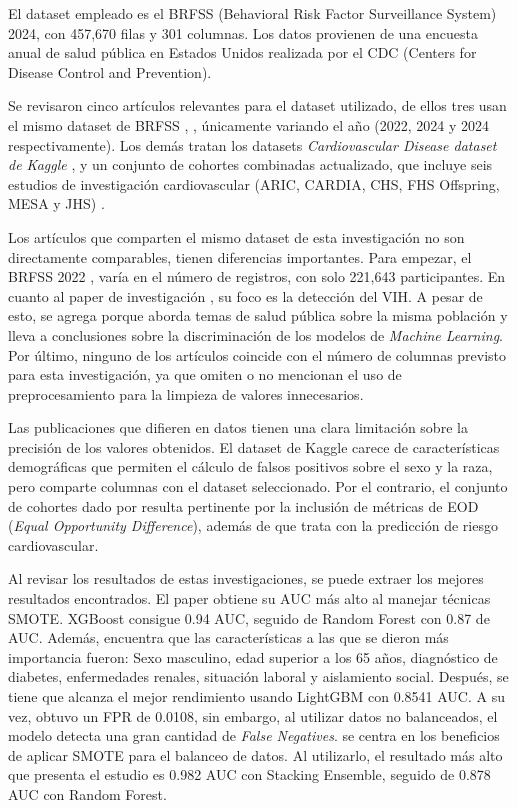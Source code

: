 \documentclass[conference]{IEEEtran}
\begin{document}
El dataset empleado es el BRFSS (Behavioral Risk Factor Surveillance System) 2024, con 457,670 filas y 301 columnas. Los datos provienen de una encuesta anual de salud pública en Estados Unidos realizada por el CDC (Centers for Disease Control and Prevention). 

Se revisaron cinco artículos relevantes para el dataset utilizado, de ellos tres usan el mismo dataset de BRFSS \cite{imani2026predicting}, \cite{islam2026leakage}, \cite{farquhar2026persistent} únicamente variando el año (2022, 2024 y 2024 respectivamente). Los demás tratan los datasets \textit{Cardiovascular Disease dataset de Kaggle} \cite{dritsas2023efficient}, y un conjunto de cohortes combinadas actualizado, que incluye seis estudios de investigación cardiovascular (ARIC, CARDIA, CHS, FHS Offspring, MESA y JHS) \cite{li2023evaluating}.

Los artículos que comparten el mismo dataset de esta investigación no son directamente comparables, tienen diferencias importantes. Para empezar, el BRFSS 2022 \cite{imani2026predicting}, varía en el número de registros, con solo 221,643 participantes. En cuanto al paper de investigación \cite{farquhar2026persistent}, su foco es la detección del VIH. A pesar de esto, se agrega porque aborda temas de salud pública sobre la misma población y lleva a conclusiones sobre la discriminación de los modelos de \textit{Machine Learning}. Por último, ninguno de los artículos coincide con el número de columnas previsto para esta investigación, ya que omiten o no mencionan el uso de preprocesamiento para la limpieza de valores innecesarios.

Las publicaciones que difieren en datos tienen una clara limitación sobre la precisión de los valores obtenidos. El dataset de Kaggle \cite{dritsas2023efficient} carece de características demográficas que permiten el cálculo de falsos positivos sobre el sexo y la raza, pero comparte columnas con el dataset seleccionado. Por el contrario, el conjunto de cohortes dado por \cite{li2023evaluating} resulta pertinente por la inclusión de métricas de EOD (\textit{Equal Opportunity Difference}), además de que trata con la predicción de riesgo cardiovascular.

Al revisar los resultados de estas investigaciones, se puede extraer los mejores resultados encontrados. El paper \cite{imani2026predicting} obtiene su AUC más alto al manejar técnicas SMOTE. XGBoost consigue 0.94 AUC, seguido de Random Forest con 0.87 de AUC. Además, encuentra que las características a las que se dieron más importancia fueron: Sexo masculino, edad superior a los 65 años, diagnóstico de diabetes, enfermedades renales, situación laboral y aislamiento social. Después, se tiene que \cite{islam2026leakage} alcanza el mejor rendimiento usando LightGBM con 0.8541 AUC. A su vez, obtuvo un FPR de 0.0108, sin embargo, al utilizar datos no balanceados, el modelo detecta una gran cantidad de \textit{False Negatives}. \cite{dritsas2023efficient} se centra en los beneficios de aplicar SMOTE para el balanceo de datos. Al utilizarlo, el resultado más alto que presenta el estudio es 0.982 AUC con Stacking Ensemble, seguido de 0.878 AUC con Random Forest.
\end{document}
